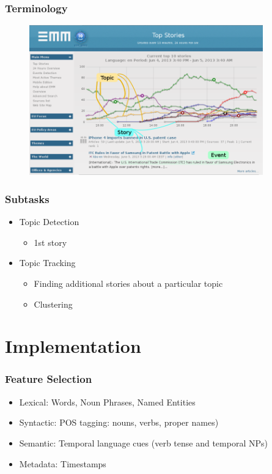 \documentclass{beamer}
\begin{document}
\begin{frame}
  \frametitle{Terminology}
  \begin{figure}[h]
    \centering
    \includegraphics[width=0.9\textwidth]{images/emm_1}
  \end{figure}
\end{frame}

\begin{frame}
	\frametitle{Subtasks}
	\begin{itemize}
		\item Topic Detection
			\begin{itemize}
				\item 1st story
			\end{itemize}
		\item Topic Tracking
			\begin{itemize}
				\item Finding additional stories about a particular topic
				\item Clustering
			\end{itemize}
	\end{itemize}
\end{frame}

\section{Implementation}
\begin{frame}
	\frametitle{Feature Selection}
	\begin{itemize}
		\item Lexical: Words, Noun Phrases, Named Entities
		\item Syntactic: POS tagging: nouns, verbs, proper names)
		\item Semantic: Temporal language cues (verb tense and temporal NPs)\citep{Makkonen:2003:UTITDT}
		\item Metadata: Timestamps
	\end{itemize}
\end{frame}
\end{document}
